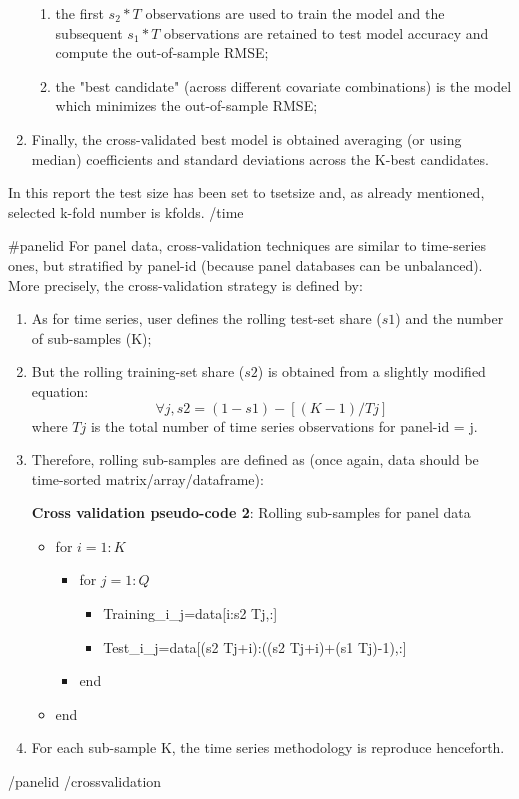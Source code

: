 \documentclass{article}
\begin{document}
\begin{enumerate}
\begin{enumerate}
\item the first $s_{2}*T$ observations are used to train the model and the subsequent $s_{1}*T$ observations are retained to test model accuracy and compute the out-of-sample RMSE;
\item the "best candidate" (across different covariate combinations) is the model which minimizes the out-of-sample RMSE;
\end{enumerate}
\item Finally, the cross-validated best model is obtained averaging (or using median) coefficients and standard deviations across the K-best candidates.
\end{enumerate}

In this report the test size has been set to {{tsetsize}} and, as already mentioned,
selected k-fold number is {{kfolds}}.
{{/time}}

{{#panelid}}
For panel data, cross-validation techniques are similar to time-series ones, but stratified by panel-id (because panel databases can be unbalanced). More precisely, the cross-validation strategy is defined by:

\begin{enumerate}
\item As for time series, user defines the rolling test-set share ($s1$) and the number of sub-samples (K);
\item But the rolling training-set share ($s2$) is obtained from a slightly modified equation:
\begin{equation}
  \forall j, s2=(1-s1)-[(K-1)/T{j}] 
\end{equation}
where $T{j}$ is the total number of time series observations for panel-id = j.
\item Therefore, rolling sub-samples are defined as (once again, data should be time-sorted matrix/array/dataframe):

\begin{algorithm}
\caption*{\textbf{Cross validation pseudo-code 2}: Rolling sub-samples for panel data}
\begin{itemize}
    \item[] for $i=1:K$
    \begin{itemize}
        \item[]  for $j=1:Q$
        \begin{itemize}
            \item[] Training\_i\_j=data[i:s2 \times T{j},:]
            \item[] Test\_i\_j=data[(s2 \times T{j}+i):((s2 \times T{j}+i)+(s1 \times T{j})-1),:]
        \end{itemize}
        \item[] end
    \end{itemize}
    \item[] end
\end{itemize}     
\end{algorithm}

\item For each sub-sample K, the time series methodology is reproduce henceforth.
\end{enumerate}
{{/panelid}}
{{/crossvalidation}}
\end{document}
